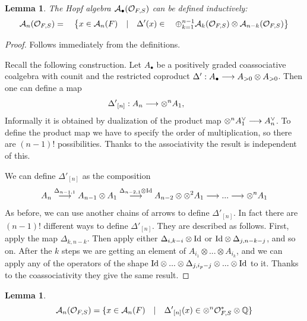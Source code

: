 \documentclass[10pt]{article}
\newtheorem{lemma}[theorem]{Lemma}
\begin{document}
\begin{lemma} \label{5-18.00.2}
The Hopf algebra ${\cal A}_{\bullet}({\cal O}_{F, S})$ can  
be defined inductively: 
\begin{equation} \label{5-28.00.1}
{\cal A}_{n}({\cal O}_{F, S}) = \quad \left\{x \in {\cal A}_{n}(F)\quad | \quad \Delta'(x) \in \quad \oplus_{k=1}^{n-1} {\cal A}_{k}({\cal O}_{F, S}) \otimes 
{\cal A}_{n-k}({\cal O}_{F, S}) \right\}
\end{equation}
\end{lemma}

\begin{proof} Follows immediately from the definitions. 

Recall the following construction. Let $A_{\bullet}$ 
be a positively graded coassociative coalgebra with counit and 
the restricted coproduct 
$\Delta': A_{\bullet} \longrightarrow A_{>0}\otimes A_{>0}$. Then 
one can  define a  map 
$$
{\Delta'}_{[n]}: A_{n} \longrightarrow \otimes^{n} A_{1}, \qquad 
$$
Informally it is obtained by dualization of the product map 
$\otimes^{n} A_{1}^{\vee} \longrightarrow A_{n}^{\vee}$. To define the product map we 
have to specify the order of multiplication, so there are $(n-1)!$ possibilities. Thanks to the associativity 
the result is independent of this. 

We can 
define ${\Delta'}_{[n]}$ as the composition
$$
A_{n} \stackrel{\Delta_{n-1,1}}{\longrightarrow} A_{n-1}\otimes A_{1} 
\stackrel{\Delta_{n-2,1} \otimes {\rm Id}}{\longrightarrow} A_{n-2} \otimes \otimes^2 A_{1} \longrightarrow ... \longrightarrow \otimes^n A_{1}
$$ 
As before, we can use another chains of arrows to define ${\Delta'}_{[n]}$. 
In fact there are $(n-1)!$ different ways to  define ${\Delta'}_{[n]}$. 
They are described as follows. First, apply the map $\Delta_{k,n-k}$. Then apply either 
$\Delta_{i,k-i} \otimes {\rm Id}$ or ${\rm Id} \otimes \Delta_{j, n-k-j}$, and so on. After the $k$ steps we are getting an element of
$A_{i_1} \otimes ... \otimes  A_{i_k}$, and we can apply any of the operators of the shape ${\rm Id} \otimes ... \otimes \Delta_{j,i_p-j}\otimes ... \otimes {\rm Id}  $ to it.  Thanks to the coassociativity 
they give the same result.  


\end{proof}

\begin{lemma} \label{8-24.1/99}
\begin{equation} \label{8-24.10/99}
{\cal A}_{n}({\cal O}_{F, S}) = \{x \in {\cal A}_{n}(F)\quad | \quad
{\Delta'}_{[n]}(x) \in \otimes^n{\cal O}_{F, S}^*\otimes {\mathbb Q}\}
\end{equation}
\end{lemma}
\end{document}
